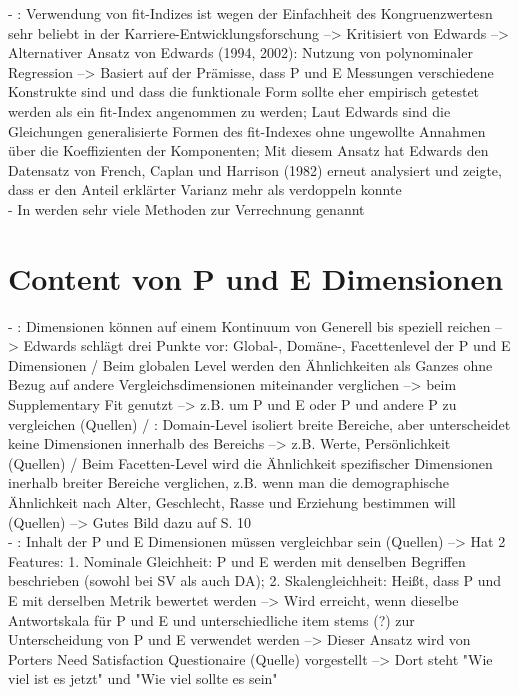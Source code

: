 - \cite[S. 7]{su:2015}: Verwendung von fit-Indizes ist wegen der Einfachheit des Kongruenzwertesn sehr beliebt in der Karriere-Entwicklungsforschung --> Kritisiert von Edwards --> Alternativer Ansatz von Edwards (1994, 2002): Nutzung von polynominaler Regression --> Basiert auf der Prämisse, dass P und E Messungen verschiedene Konstrukte sind und dass die funktionale Form sollte eher empirisch getestet werden als ein fit-Index angenommen zu werden; Laut Edwards sind die Gleichungen generalisierte Formen des fit-Indexes ohne ungewollte Annahmen über die Koeffizienten der Komponenten; Mit diesem Ansatz hat Edwards den Datensatz von French, Caplan und Harrison (1982) erneut analysiert und zeigte, dass er den Anteil erklärter Varianz mehr als verdoppeln konnte \\
- In \textcite{edwards:1991} werden sehr viele Methoden zur Verrechnung genannt \\

\section{Content von P und E Dimensionen}
\label{ch:notizen:contentVonPundEDimensionen}
- \cite[S. 6]{edwards:2007}: Dimensionen können auf einem Kontinuum von Generell bis speziell reichen --> Edwards schlägt drei Punkte vor: Global-, Domäne-, Facettenlevel der P und E Dimensionen / Beim globalen Level werden den Ähnlichkeiten als Ganzes ohne Bezug auf andere Vergleichsdimensionen miteinander verglichen --> beim Supplementary Fit genutzt --> z.B. um P und E oder P und andere P zu vergleichen (Quellen) / \cite[S. 7]{edwards:2007}: Domain-Level  isoliert breite Bereiche, aber unterscheidet keine Dimensionen innerhalb des Bereichs --> z.B. Werte, Persönlichkeit (Quellen) / Beim Facetten-Level wird die Ähnlichkeit spezifischer Dimensionen inerhalb breiter Bereiche verglichen, z.B. wenn man die demographische Ähnlichkeit nach Alter, Geschlecht, Rasse und Erziehung bestimmen will (Quellen) --> Gutes Bild dazu auf S. 10 \\
- \cite[S. 7]{edwards:2007}: Inhalt der P und E Dimensionen müssen vergleichbar sein (Quellen) --> Hat 2 Features: 1. Nominale Gleichheit: P und E werden mit denselben Begriffen beschrieben (sowohl bei SV als auch DA); 2. Skalengleichheit: Heißt, dass P und E mit derselben Metrik bewertet werden \cite{copingAndAdaption:1974} --> Wird erreicht, wenn dieselbe Antwortskala für P und E und unterschiedliche item stems (?) zur Unterscheidung von P und E verwendet werden --> Dieser Ansatz wird von Porters Need Satisfaction Questionaire (Quelle) vorgestellt --> Dort steht "Wie viel ist es jetzt" und "Wie viel sollte es sein"

